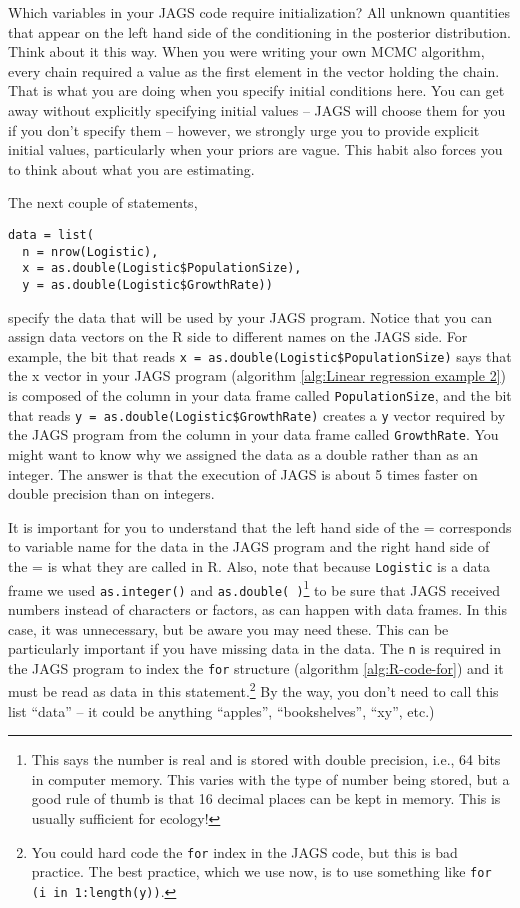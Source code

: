 \documentclass[12pt,english]{article}
\begin{document}
Which variables in your JAGS code require initialization? All unknown quantities that appear on the left hand side of the conditioning in the posterior distribution. Think about it this way. When you were writing your own MCMC algorithm, every chain required a value as the first element in the vector holding the chain. That is what you are doing when you specify initial conditions here. You can get away without explicitly specifying initial values -- JAGS will choose them for you if you don't specify them -- however, we strongly urge you to provide explicit initial values, particularly when your priors are vague. This habit also forces you to think about what you are estimating.

The next couple of statements, 

\begin{Verbatim}
data = list(
  n = nrow(Logistic),
  x = as.double(Logistic$PopulationSize),
  y = as.double(Logistic$GrowthRate))
\end{Verbatim}

\noindent specify the data that will be used by your JAGS program. Notice that you can assign data vectors on the R side to different names on the JAGS side. For example, the bit that reads \texttt{x = as.double(Logistic\$PopulationSize)} says that the x vector in your JAGS program (algorithm \ref{alg:Linear regression example 2}) is composed of the column in your data frame called \texttt{PopulationSize}, and the bit that reads \texttt{y = as.double(Logistic\$GrowthRate)} creates a \texttt{y} vector required by the JAGS program from the column in your data frame called \texttt{GrowthRate}. You might want to know why we assigned the data as a double rather than as an integer. The answer is that the execution of JAGS is about 5 times faster on double precision than on integers.

It is important for you to understand that the left hand side of the = corresponds to variable name for the data in the JAGS program and the right hand side of the = is what they are called in R. Also, note that because \texttt{Logistic} is a data frame we used \texttt{as.integer()} and \texttt{as.double( )}\footnote{This says the number is real and is stored with double precision, i.e., 64 bits in computer memory. This varies with the type of number being stored, but a good rule of thumb is that 16 decimal places can be kept in memory. This is usually sufficient for ecology!} to be sure that JAGS received numbers instead of characters or factors, as can happen with data frames. In this case, it was unnecessary, but be aware you may need these. This can be particularly important if you have missing data in the data. The \texttt{n} is required in the JAGS program to index the \texttt{for} structure (algorithm \ref{alg:R-code-for}) and it must be read as data in this statement.\footnote{You could hard code the \texttt{for} index in the JAGS code, but this is bad practice. The best practice, which we use now, is to use something like \texttt{for (i in 1:length(y))}.} By the way, you don't need to call this list \enquote{data} -- it could be anything \enquote{apples}, \enquote{bookshelves}, \enquote{xy}, etc.) 
\end{document}
